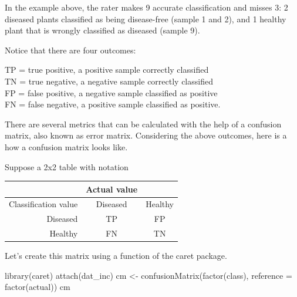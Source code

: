 \documentclass[
  letterpaper,
  DIV=11,
  numbers=noendperiod]{scrreprt}
\newenvironment{Shaded}{\begin{snugshade}}{\end{snugshade}}
\newcommand{\AttributeTok}[1]{\textcolor[rgb]{0.40,0.45,0.13}{#1}}
\newcommand{\FunctionTok}[1]{\textcolor[rgb]{0.28,0.35,0.67}{#1}}
\newcommand{\NormalTok}[1]{\textcolor[rgb]{0.00,0.23,0.31}{#1}}
\newcommand{\OtherTok}[1]{\textcolor[rgb]{0.00,0.23,0.31}{#1}}
\begin{document}
In the example above, the rater makes 9 accurate classification and
misses 3: 2 diseased plants classified as being disease-free (sample 1
and 2), and 1 healthy plant that is wrongly classified as diseased
(sample 9).

Notice that there are four outcomes:

TP = true positive, a positive sample correctly classified\\
TN = true negative, a negative sample correctly classified\\
FP = false positive, a negative sample classified as positive\\
FN = false negative, a positive sample classified as positive.

There are several metrics that can be calculated with the help of a
confusion matrix, also known as error matrix. Considering the above
outcomes, here is a how a confusion matrix looks like.

Suppose a 2x2 table with notation

\begin{longtable}[]{@{}rcc@{}}
\toprule\noalign{}
& Actual value & \\
\midrule\noalign{}
\endhead
\bottomrule\noalign{}
\endlastfoot
Classification value & Diseased & Healthy \\
Diseased & TP & FP \\
Healthy & FN & TN \\
\end{longtable}

Let's create this matrix using a function of the caret package.

\begin{Shaded}
\begin{Highlighting}[]
\FunctionTok{library}\NormalTok{(caret)}
\FunctionTok{attach}\NormalTok{(dat\_inc)}
\NormalTok{cm }\OtherTok{\textless{}{-}} \FunctionTok{confusionMatrix}\NormalTok{(}\FunctionTok{factor}\NormalTok{(class), }\AttributeTok{reference =} \FunctionTok{factor}\NormalTok{(actual))}
\NormalTok{cm}
\end{Highlighting}
\end{Shaded}
\end{document}
